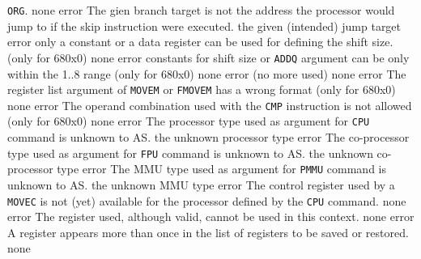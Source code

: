 \documentclass[12pt,twoside]{report}
\newcommand{\tty}[1]{{\tt #1}}
\newcommand{\asname}{{AS}}
\begin{document}
\begin{description}
{                \tty{ORG}.}
               {none}
               {error}
               {The gien branch target is not the address the processor would
                jump to if the skip instruction were executed.}
               {the given (intended) jump target}
               {error}
               {only a constant or a data register can be used for defining
                the shift size. (only for 680x0)}
               {none}
               {error}
               {constants for shift size or \tty{ADDQ} argument can be only
                within the 1..8 range (only for 680x0)}
               {none}
               {error}
               {(no more used)}
               {none}
               {error}
               {The register list argument of \tty{MOVEM} or \tty{FMOVEM} has a
                wrong format (only for 680x0)}
               {none}
               {error}
               {The operand combination used with the \tty{CMP} instruction is
                not allowed (only for 680x0)}
               {none}
               {error}
               {The processor type used as argument for \tty{CPU} command is
                unknown to \asname{}.}
               {the unknown processor type}
               {error}
               {The co-processor type used as argument for \tty{FPU} command is
                unknown to \asname{}.}
               {the unknown co-processor type}
               {error}
               {The MMU type used as argument for \tty{PMMU} command is
                unknown to \asname{}.}
               {the unknown MMU type}
               {error}
               {The control register used by a \tty{MOVEC} is not (yet) available
                for the processor defined by the \tty{CPU} command.}
               {none}
               {error}
               {The register used, although valid, cannot be used in this
                context.}
               {none}
               {error}
               {A register appears more than once in the list of registers
                to be saved or restored.}
               {none}

\end{description}
\end{document}
